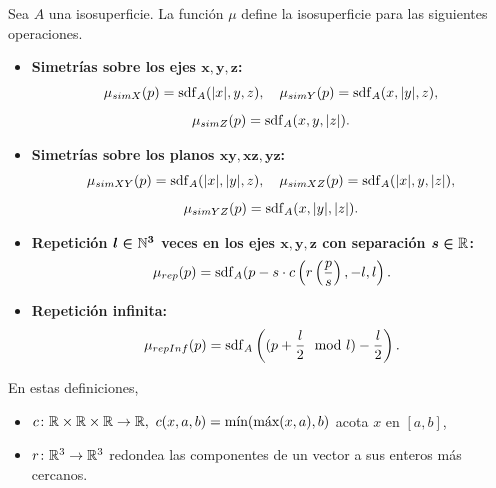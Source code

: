 \begin{definicion}\label{d:posicionamiento}
    Sea $A$ una isosuperficie. La función $\mu$ define la isosuperficie para las siguientes operaciones.
    \begin{itemize}
        \item \textbf{Simetrías sobre los ejes $\boldsymbol{x,y,z}$:}
        \begin{gather*}
            \mu_{simX}(p) = \operatorname{sdf}_{A}(\vert x\vert, y, z),\quad \mu_{simY}(p) = \operatorname{sdf}_{A}(x, \vert y\vert,  z),\\[5pt] \mu_{simZ}(p) = \operatorname{sdf}_{A}(x,y,\vert z\vert).
        \end{gather*}
        \item \textbf{Simetrías sobre los planos $\boldsymbol{xy,xz,yz}$:}
        \begin{gather*}
            \mu_{simXY}(p) = \operatorname{sdf}_{A}(\vert x\vert, \vert y\vert, z),\quad \mu_{simXZ}(p) = \operatorname{sdf}_{A}(\vert x\vert, y,  \vert z\vert),\\[5pt]\mu_{simYZ}(p) = \operatorname{sdf}_{A}(x,\vert y\vert ,\vert z\vert).
        \end{gather*}
        \item \textbf{Repetición $\boldsymbol{l\in \mathbb{N}^3}$ veces en los ejes $\boldsymbol{x,y,z}$ con separación $\boldsymbol{s\in\mathbb{R}}$:} 
        \begin{equation*}
            \mu_{rep}(p) = \operatorname{sdf}_{A}(p - s\cdot c\left(r\left(\frac{p}{s}\right), -l, l\right).
        \end{equation*}
        \item \textbf{Repetición infinita:}
        \begin{equation*}
            \mu_{repInf}(p) = \operatorname{sdf}_{A}\left((p+\frac{l}{2}\mod l )- \frac{l}{2}\right).
        \end{equation*}
    \end{itemize}
    En estas definiciones,
    \begin{itemize}
        \item $c\colon \R\times\R\times\R\to \R,\ c(x,a,b) = \Min(\Max(x, a), b)$ acota $x$ en $[a,b]$,
        \item $r\colon \mathbb{R}^3 \to \mathbb{R}^3$ redondea las componentes de un vector a sus enteros más cercanos.
    \end{itemize}
\end{definicion}
